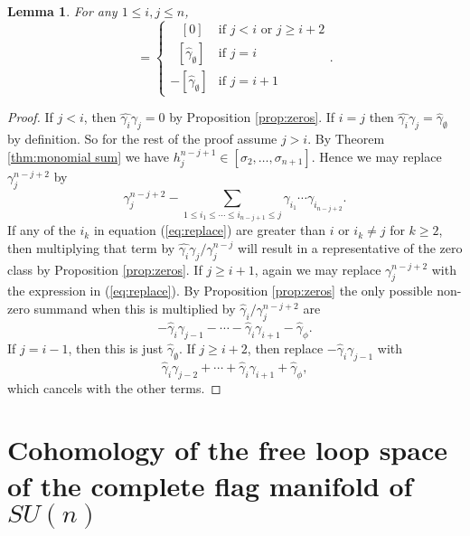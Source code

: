 \documentclass{article}
\theoremstyle{plain}
\newtheorem{lem}[thm]{Lemma}
\theoremstyle{definition}
\numberwithin{thm}{section}
\begin{document}
			
			\begin{lem}\label{lem:OneMissing}
				For any $1\leq i,j\leq n$,
				\begin{equation*}
					[\hat{\gamma_i}\gamma_j]=
					\begin{cases}
						\;\;\; [0]  &\mbox{if  } j < i \text{ or } j \geq i+2 
						\\
						\;\; [\hat{\gamma}_{\emptyset}] &\text{if  } j=i
						\\
						-[\hat{\gamma}_{\emptyset}] &\text{if  } j=i+1
						\end{cases}
					.
				\end{equation*}
			\end{lem}
			\begin{proof}
				If $j < i$, then $\hat{\gamma_i}\gamma_j=0$ by Proposition \ref{prop:zeros}.
				If $i = j$ then $\hat{\gamma_i}\gamma_j=\hat{\gamma}_{\emptyset}$ by definition.
				So for the rest of the proof assume $j>i$.
				By Theorem \ref{thm:monomial sum} we have $h_{j}^{n-j+1}\in [\sigma_2,\dots,\sigma_{n+1}]$.
				Hence we may replace $\gamma_j^{n-j+2}$ by
				\begin{equation}\label{eq:replace}
					\gamma_j^{n-j+2}-\sum_{1\leq i_1 \leq \cdots \leq i_{n-j+1} \leq j}{\gamma_{i_1} \cdots \gamma_{i_{n-j+2}}}.
				\end{equation}
				If any of the $i_k$ in equation (\ref{eq:replace}) are greater than $i$ or $i_k\neq j$ for $k \geq 2$,
				then multiplying that term by $\hat{\gamma_i}\gamma_j/\gamma_j^{n-j}$ 
				will result in a representative of the zero class by Proposition \ref{prop:zeros}.
				If $j \geq i+1$, again we may replace $\gamma_j^{n-j+2}$ with the expression in (\ref{eq:replace}).
				By Proposition \ref{prop:zeros} the only possible non-zero summand when this is multiplied by $\hat{\gamma}_i/\gamma_j^{n-j+2}$ are
				\begin{equation*}
				-\hat{\gamma}_i\gamma_{j-1}-\cdots-\hat{\gamma}_{i}\gamma_{i+1}-\hat{\gamma}_{\phi}.
				\end{equation*}
				If $j=i-1$, then this is just $\hat{\gamma}_{\emptyset}$.
				If $j \geq i+2$, then replace $-\hat{\gamma}_i\gamma_{j-1}$ with
				\begin{equation*}
					\hat{\gamma}_i\gamma_{j-2}+\cdots+\hat{\gamma}_{i}\gamma_{i+1}+\hat{\gamma}_{\phi},
				\end{equation*}
				which cancels with the other terms.
			\end{proof}

\newpage
\section{Cohomology of the free loop space of the complete flag manifold of $SU(n)$}\label{sec:FreeLoopSU(n+1)/Tn}
		
\end{document}
